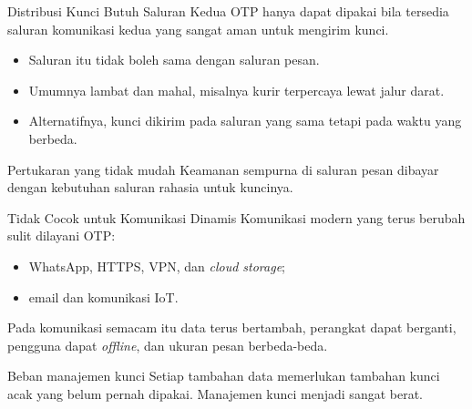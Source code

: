 \documentclass[aspectratio=169,11pt]{beamer}
\begin{document}
\begin{frame}{Distribusi Kunci Butuh Saluran Kedua}
    \footnotesize
    OTP hanya dapat dipakai bila tersedia saluran komunikasi kedua yang
    sangat aman untuk mengirim kunci.
    \begin{itemize}
        \item Saluran itu tidak boleh sama dengan saluran pesan.
        \item Umumnya lambat dan mahal, misalnya kurir terpercaya lewat
              jalur darat.
        \item Alternatifnya, kunci dikirim pada saluran yang sama tetapi
              pada waktu yang berbeda.
    \end{itemize}
    \vspace{0.2cm}
    \begin{alertblock}{Pertukaran yang tidak mudah}
        Keamanan sempurna di saluran pesan dibayar dengan kebutuhan
        saluran rahasia untuk kuncinya.
    \end{alertblock}
\end{frame}

\begin{frame}{Tidak Cocok untuk Komunikasi Dinamis}
    \footnotesize
    Komunikasi modern yang terus berubah sulit dilayani OTP:
    \begin{itemize}
        \item WhatsApp, HTTPS, VPN, dan \textit{cloud storage};
        \item email dan komunikasi IoT.
    \end{itemize}
    Pada komunikasi semacam itu data terus bertambah, perangkat dapat
    berganti, pengguna dapat \textit{offline}, dan ukuran pesan
    berbeda-beda.
    \vspace{0.1cm}
    \begin{alertblock}{Beban manajemen kunci}
        Setiap tambahan data memerlukan tambahan kunci acak yang belum
        pernah dipakai. Manajemen kunci menjadi sangat berat.
    \end{alertblock}
\end{frame}
\end{document}
